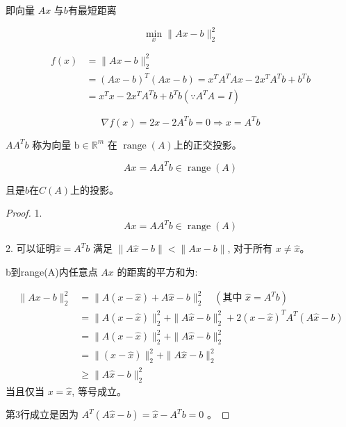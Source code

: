 即向量 $ A x $ 与$b$有最短距离

$$
\min _{x}\|A x-b\|_{2}^{2}
$$

$$ \begin{aligned} f(x) &=\|A x-b\|_{2}^{2}
    \\ & =(A x-b)^{T}(A x-b)=x^{T} A^{T} A x-2 x^{T} A^{T} b+b^{T} b \\ &=x^{T} x-2 x^{T} A^{T} b+b^{T} b\left(\because A^{T} A=I\right) \end{aligned} $$

$$ \nabla f(x)=2 x-2 A^{T} b=0 \Rightarrow x=A^{T} b $$

$ A A^{T} b $ 称为向量 $ \mathrm{b} \in \mathbb{R}^{m} $ 在 $ \operatorname{range} (A)$上的正交投影。

\begin{theorem}
    $$ A x=A A^{T} b \in \operatorname{range}(A) $$

    且是$b$在$C(A)$上的投影。
\end{theorem}

\begin{proof}
    1.
    $$ A x=A A^{T} b \in \operatorname{range}(A) $$

    2. 可以证明$ \hat{x}=A^{T} b $ 满足 $ \|A \hat{x}-b\|<\|A x-b\| $, 对于所有 $ x \neq \hat{x} $。

    b到range(A)内任意点 $ A x $ 的距离的平方和为:

    $$ \begin{aligned}\|A x-b\|_{2}^{2} &=\|A(x-\hat{x})+A \hat{x}-b\|_{2}^{2} \quad\left(\text {其中 } \hat{x}=A^{T} b\right) \\ &=\|A(x-\hat{x})\|_{2}^{2}+\|A \hat{x}-b\|_{2}^{2}+2(x-\hat{x})^{T} A^{T}(A \hat{x}-b) \\ &=\|A(x-\hat{x})\|_{2}^{2}+\|A \hat{x}-b\|_{2}^{2} \\ &=\|(x-\hat{x})\|_{2}^{2}+\|A \hat{x}-b\|_{2}^{2} \\ & \geq\|A \hat{x}-b\|_{2}^{2} \end{aligned} $$
当且仅当 $ x=\hat{x} $, 等号成立。

第3行成立是因为 $ A^{T}(A \hat{x}-b)=\hat{x}-A^{T} b=0 $ 。
\end{proof}

